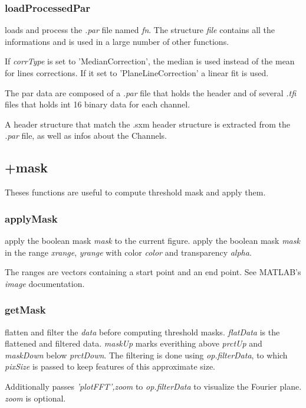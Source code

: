\subsubsection{loadProcessedPar}
\bdf
{} loads and process the \emph{.par} file named \emph{fn}. The structure \emph{file} contains all the informations and is used in a large number of other functions.

 If \emph{corrType} is set to 'MedianCorrection', the median is used instead of the mean for lines corrections. If it set to 'PlaneLineCorrection' a linear fit is used. 

\edf

The par data are composed of a \emph{.par} file that holds the header and of several \emph{.tfi} files that holds int 16 binary data for each channel. 

A header structure that match the .sxm header structure is extracted from the \emph{.par} file, as well as infos about the Channels.
\subsection{+mask}
Theses functions are useful to compute threshold mask and apply them.
\subsubsection{applyMask}
\bdf
{} apply the boolean mask \emph{mask} to the current figure. 
 apply the boolean mask \emph{mask} in the range \emph{xrange}, \emph{yrange} with color \emph{color} and transparency \emph{alpha}. 
\edf

The ranges are vectors containing a start point and an end point. See MATLAB's \emph{image} documentation.

\subsubsection{getMask}
\bdf
{}
 flatten and filter the \emph{data} before computing threshold masks. \emph{flatData} is the flattened and filtered data. \emph{maskUp} marks everithing above \emph{prctUp} and \emph{maskDown} below \emph{prctDown}. The filtering is done using \emph{op.filterData}, to which \emph{pixSize} is passed to keep features of this approximate size.

Additionally passes \emph{'plotFFT',zoom} to \emph{op.filterData} to visualize the Fourier plane. \emph{zoom} is optional.
\edf

